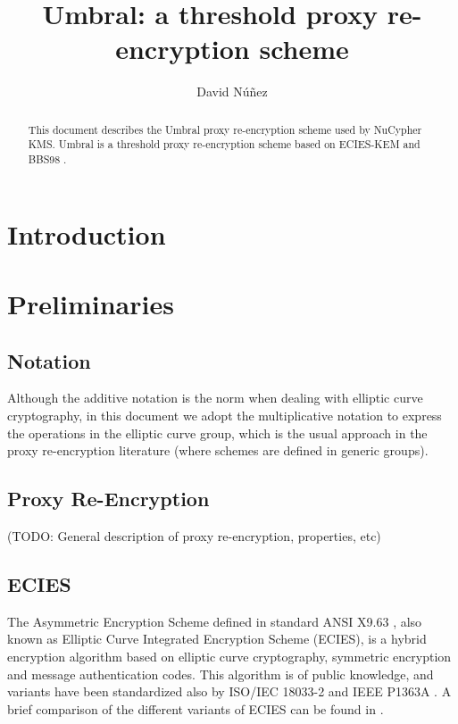 \documentclass[12pt]{article}
\title{Umbral: a threshold proxy re-encryption scheme}
\author{David Núñez}
\date{} %
\begin{document}
\maketitle

\begin{abstract}
This document describes the Umbral proxy re-encryption scheme used by NuCypher KMS. 
Umbral is a threshold proxy re-encryption scheme based on ECIES-KEM \cite{ansi-x9.63} and BBS98 \cite{blaze1998divertible}. 


\end{abstract}



\section{Introduction}

\section{Preliminaries}

\subsection{Notation}

Although the additive notation is the norm when dealing with elliptic curve cryptography, in this document we adopt the multiplicative notation to express the operations in the elliptic curve group, which is the usual approach in the proxy re-encryption literature (where schemes are defined in generic groups).

\subsection{Proxy Re-Encryption}

(TODO: General description of proxy re-encryption, properties, etc)

\subsection{ECIES}

The Asymmetric Encryption Scheme defined in standard ANSI X9.63 \cite{ansi-x9.63}, also known as Elliptic Curve Integrated Encryption Scheme (ECIES), is a hybrid encryption algorithm based on elliptic curve cryptography, symmetric encryption and message authentication codes. 
This algorithm is of public knowledge, and variants have been standardized also by ISO/IEC 18033-2 \cite{iso-18033-2} and IEEE P1363A \cite{ieee-p1363a}. A brief comparison of the different variants of ECIES can be found in \cite{martinez2010comparison}. 
\end{document}
